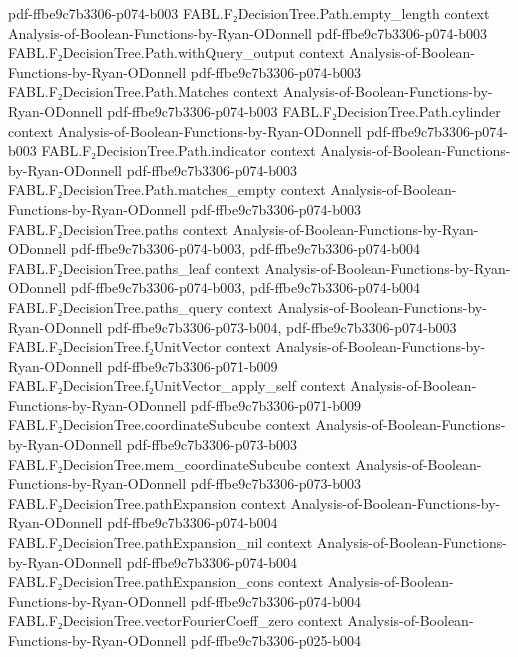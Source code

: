 \begin{theorem}
  {pdf-ffbe9c7b3306-p074-b003}
\proofstep
  {FABL.F₂DecisionTree.Path.empty_length}
  {context}
  {Analysis-of-Boolean-Functions-by-Ryan-ODonnell}
  {pdf-ffbe9c7b3306-p074-b003}
\proofstep
  {FABL.F₂DecisionTree.Path.withQuery_output}
  {context}
  {Analysis-of-Boolean-Functions-by-Ryan-ODonnell}
  {pdf-ffbe9c7b3306-p074-b003}
\proofstep
  {FABL.F₂DecisionTree.Path.Matches}
  {context}
  {Analysis-of-Boolean-Functions-by-Ryan-ODonnell}
  {pdf-ffbe9c7b3306-p074-b003}
\proofstep
  {FABL.F₂DecisionTree.Path.cylinder}
  {context}
  {Analysis-of-Boolean-Functions-by-Ryan-ODonnell}
  {pdf-ffbe9c7b3306-p074-b003}
\proofstep
  {FABL.F₂DecisionTree.Path.indicator}
  {context}
  {Analysis-of-Boolean-Functions-by-Ryan-ODonnell}
  {pdf-ffbe9c7b3306-p074-b003}
\proofstep
  {FABL.F₂DecisionTree.Path.matches_empty}
  {context}
  {Analysis-of-Boolean-Functions-by-Ryan-ODonnell}
  {pdf-ffbe9c7b3306-p074-b003}
\proofstep
  {FABL.F₂DecisionTree.paths}
  {context}
  {Analysis-of-Boolean-Functions-by-Ryan-ODonnell}
  {pdf-ffbe9c7b3306-p074-b003,
    pdf-ffbe9c7b3306-p074-b004}
\proofstep
  {FABL.F₂DecisionTree.paths_leaf}
  {context}
  {Analysis-of-Boolean-Functions-by-Ryan-ODonnell}
  {pdf-ffbe9c7b3306-p074-b003,
    pdf-ffbe9c7b3306-p074-b004}
\proofstep
  {FABL.F₂DecisionTree.paths_query}
  {context}
  {Analysis-of-Boolean-Functions-by-Ryan-ODonnell}
  {pdf-ffbe9c7b3306-p073-b004,
    pdf-ffbe9c7b3306-p074-b003}
\proofstep
  {FABL.F₂DecisionTree.f₂UnitVector}
  {context}
  {Analysis-of-Boolean-Functions-by-Ryan-ODonnell}
  {pdf-ffbe9c7b3306-p071-b009}
\proofstep
  {FABL.F₂DecisionTree.f₂UnitVector_apply_self}
  {context}
  {Analysis-of-Boolean-Functions-by-Ryan-ODonnell}
  {pdf-ffbe9c7b3306-p071-b009}
\proofstep
  {FABL.F₂DecisionTree.coordinateSubcube}
  {context}
  {Analysis-of-Boolean-Functions-by-Ryan-ODonnell}
  {pdf-ffbe9c7b3306-p073-b003}
\proofstep
  {FABL.F₂DecisionTree.mem_coordinateSubcube}
  {context}
  {Analysis-of-Boolean-Functions-by-Ryan-ODonnell}
  {pdf-ffbe9c7b3306-p073-b003}
\proofstep
  {FABL.F₂DecisionTree.pathExpansion}
  {context}
  {Analysis-of-Boolean-Functions-by-Ryan-ODonnell}
  {pdf-ffbe9c7b3306-p074-b004}
\proofstep
  {FABL.F₂DecisionTree.pathExpansion_nil}
  {context}
  {Analysis-of-Boolean-Functions-by-Ryan-ODonnell}
  {pdf-ffbe9c7b3306-p074-b004}
\proofstep
  {FABL.F₂DecisionTree.pathExpansion_cons}
  {context}
  {Analysis-of-Boolean-Functions-by-Ryan-ODonnell}
  {pdf-ffbe9c7b3306-p074-b004}
\proofstep
  {FABL.F₂DecisionTree.vectorFourierCoeff_zero}
  {context}
  {Analysis-of-Boolean-Functions-by-Ryan-ODonnell}
  {pdf-ffbe9c7b3306-p025-b004}

\end{theorem}
